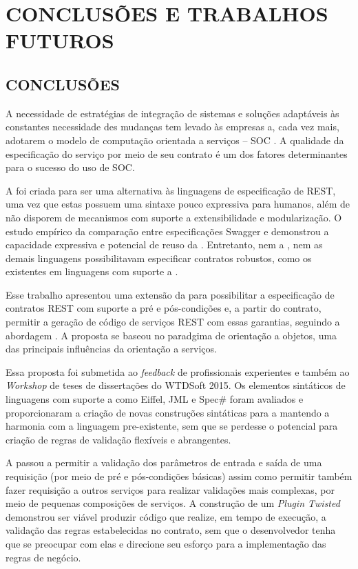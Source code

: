 \chapter{CONCLUSÕES E TRABALHOS FUTUROS}
\vspace{-6mm}

\section{CONCLUSÕES}
\vspace{-6mm}

A necessidade de estratégias de integração de sistemas e soluções adaptáveis às
constantes necessidade des mudanças tem levado às empresas a, cada vez mais,
adotarem o modelo de computação orientada a serviços -- SOC
\cite{papazoglou2008service} \cite{erl2009web}. A qualidade da especificação do
serviço por meio de seu contrato é um dos fatores determinantes para o sucesso
do uso de SOC.

A \neoidl{} foi criada para ser uma alternativa às linguagens de especificação
de \wss REST, uma vez que estas possuem uma sintaxe pouco expressiva para humanos,
além de não disporem de mecanismos com suporte a extensibilidade e modularização. O estudo
empírico da comparação entre especificações Swagger e \neoidl{} demonstrou a capacidade
expressiva e potencial de reuso da \neoidl{}. 
Entretanto, nem a \neoidl{}, nem as demais linguagens possibilitavam especificar 
contratos robustos, como os existentes em linguagens com suporte a \designbycontract{}.

Esse trabalho apresentou uma extensão da \neoidl{} para possibilitar a especificação
de contratos REST com suporte a pré e pós-condições e, a partir do contrato, permitir
a geração de código de serviços REST com essas garantias, seguindo a abordagem
\CtFirst{}. A proposta se baseou no paradgima de orientação a objetos, uma das 
principais influências da orientação a serviços.

Essa proposta foi submetida ao \textit{feedback} de profissionais experientes e também ao 
\textit{Workshop} de teses de dissertações do WTDSoft 2015. Os elementos sintáticos
de linguagens com suporte a \designbycontract{} como Eiffel, JML e Spec\# foram avaliados
e proporcionaram a criação de novas construções sintáticas para a \neoidl{} mantendo a harmonia com 
a linguagem pre-existente, sem que se perdesse o potencial para criação de regras de validação flexíveis e abrangentes.

A \neoidl{} passou a permitir a validação dos parâmetros de entrada e saída de uma requisição (por meio
de pré e pós-condições básicas) assim como permitir também fazer requisição a outros serviços para realizar validações mais
complexas, por meio de pequenas composições de serviços. A construção de um \textit{Plugin Twisted} demonstrou ser
viável produzir código que realize, em tempo de execução, a validação das regras estabelecidas no contrato, sem que o 
desenvolvedor tenha que se preocupar com elas e direcione seu esforço para a implementação das regras
de negócio.

